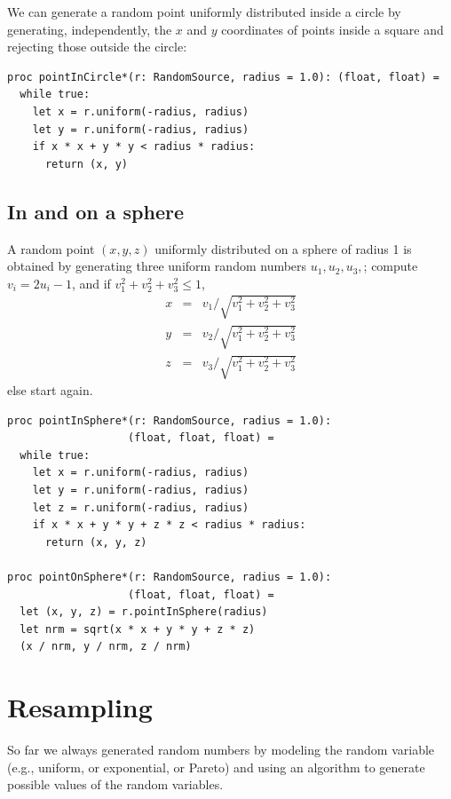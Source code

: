 \documentclass[justified, sixbynine]{tufte-book}
\def\ft{\small\tt}
\theoremstyle{plain}%
\newtheorem * {corollary}{Corollary}
\theoremstyle{definition}
\theoremstyle{remark}
\newtheorem * {remark}{Remark}
\newtheorem * {note}{Note}
\begin{document}
\begin{fullwidth}
We can generate a random point uniformly distributed inside a circle by generating, independently, the $x$ and $y$ coordinates of points inside a square and rejecting those outside the circle:

\begin{lstlisting}[caption={in file: {\ft nlib.nim}}]
proc pointInCircle*(r: RandomSource, radius = 1.0): (float, float) =
  while true:
    let x = r.uniform(-radius, radius)
    let y = r.uniform(-radius, radius)
    if x * x + y * y < radius * radius:
      return (x, y)
\end{lstlisting}

\goodbreak\subsection{In and on a sphere}

A random point $(x, y, z)$ uniformly distributed on a sphere of radius 1 is
obtained by generating three uniform random numbers $u_1, u_2, u_3, $; compute $%
v_i=2u_i-1$, and if $v_1^2+v_2^2+v_3^2\leq 1$, 
\begin{eqnarray}
x &=&v_1/\sqrt{v_1^2+v_2^2+v_3^2} \\
y &=&v_2/\sqrt{v_1^2+v_2^2+v_3^2} \\
z &=&v_3/\sqrt{v_1^2+v_2^2+v_3^2}
\end{eqnarray}
else start again.

\begin{lstlisting}[caption={in file: {\ft nlib.nim}}]
proc pointInSphere*(r: RandomSource, radius = 1.0):
                   (float, float, float) =
  while true:
    let x = r.uniform(-radius, radius)
    let y = r.uniform(-radius, radius)
    let z = r.uniform(-radius, radius)
    if x * x + y * y + z * z < radius * radius:
      return (x, y, z)

proc pointOnSphere*(r: RandomSource, radius = 1.0):
                   (float, float, float) =
  let (x, y, z) = r.pointInSphere(radius)
  let nrm = sqrt(x * x + y * y + z * z)
  (x / nrm, y / nrm, z / nrm)
\end{lstlisting}

\section{Resampling}

So far we always generated random numbers by modeling the random variable (e.g., uniform, or exponential, or Pareto) and using an algorithm to generate possible values of the random variables.


\end{fullwidth}
\end{document}
